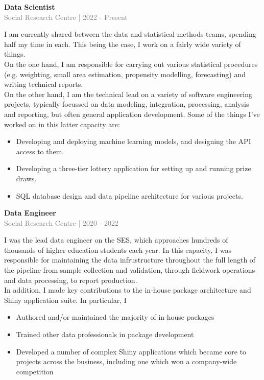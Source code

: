 \documentclass[10pt]{article}
\begin{document}
{\bf Data Scientist} \\
\textcolor{gray}{Social Research Centre | 2022 - Present} \\[3pt]
\begin{small}
I am currently shared between the data and statistical methods teams, spending half my time in each. This being the case, I work on a fairly wide variety of things.\\

On the one hand, I am responsible for carrying out various statistical procedures (e.g. weighting, small area estimation, propensity modelling, forecasting) and writing technical reports.\\

On the other hand, I am the technical lead on a variety of software engineering projects, typically focussed on data modeling, integration, processing, analysis and reporting, but often general application development. Some of the things I've worked on in this latter capacity are:

\begin{itemize}
\item Developing and deploying machine learning models, and designing the API access to them.

\item Developing a three-tier lottery application for setting up and running prize draws.

\item SQL database design and data pipeline architecture for various projects.

\end{itemize}

\end{small}
\vspace{0.5cm}
{\bf Data Engineer} \\
\textcolor{gray}{Social Research Centre | 2020 - 2022} \\[3pt]
\begin{small}
I was the lead data engineer on the {SES}, which approaches hundreds of thousands of higher education students each year. In this capacity, I was responsible for maintaining the data infrustructure throughout the full length of the pipeline from sample collection and validation, through fieldwork operations and data processing, to report production.\\

In addition, I made key contributions to the in-house package architecture and Shiny application suite. In particular, I

\begin{itemize}
\item Authored and/or maintained the majority of in-house packages

\item Trained other data professionals in package development

\item Developed a number of complex Shiny applications which became core to projects across the business, including one which won a company-wide competition

\end{itemize}

\end{small}
\end{document}
